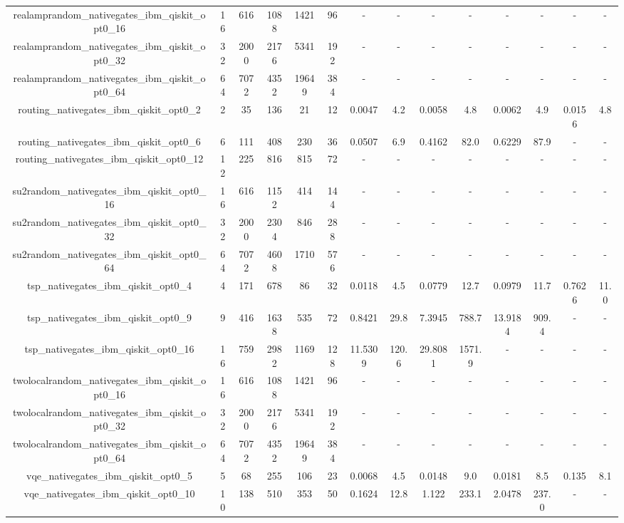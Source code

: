 \begin{table}[htb]
{\begin{tabular}{|c|c|c|c|c|c|c|c|c|c|c|c|c|c|}
realamprandom\_nativegates\_ibm\_qiskit\_opt0\_16 & 16 & 616 & 1088 & 1421 & 96 & - & - & - & - & - & - & - & - \\ 
realamprandom\_nativegates\_ibm\_qiskit\_opt0\_32 & 32 & 2000 & 2176 & 5341 & 192 & - & - & - & - & - & - & - & - \\ 
realamprandom\_nativegates\_ibm\_qiskit\_opt0\_64 & 64 & 7072 & 4352 & 19649 & 384 & - & - & - & - & - & - & - & - \\ 
routing\_nativegates\_ibm\_qiskit\_opt0\_2 & 2 & 35 & 136 & 21 & 12 & 0.0047 & 4.2 & 0.0058 & 4.8 & 0.0062 & 4.9 & 0.0156 & 4.8 \\ 
routing\_nativegates\_ibm\_qiskit\_opt0\_6 & 6 & 111 & 408 & 230 & 36 & 0.0507 & 6.9 & 0.4162 & 82.0 & 0.6229 & 87.9 & - & - \\ 
routing\_nativegates\_ibm\_qiskit\_opt0\_12 & 12 & 225 & 816 & 815 & 72 & - & - & - & - & - & - & - & - \\ 
su2random\_nativegates\_ibm\_qiskit\_opt0\_16 & 16 & 616 & 1152 & 414 & 144 & - & - & - & - & - & - & - & - \\ 
su2random\_nativegates\_ibm\_qiskit\_opt0\_32 & 32 & 2000 & 2304 & 846 & 288 & - & - & - & - & - & - & - & - \\ 
su2random\_nativegates\_ibm\_qiskit\_opt0\_64 & 64 & 7072 & 4608 & 1710 & 576 & - & - & - & - & - & - & - & - \\ 
tsp\_nativegates\_ibm\_qiskit\_opt0\_4 & 4 & 171 & 678 & 86 & 32 & 0.0118 & 4.5 & 0.0779 & 12.7 & 0.0979 & 11.7 & 0.7626 & 11.0 \\ 
tsp\_nativegates\_ibm\_qiskit\_opt0\_9 & 9 & 416 & 1638 & 535 & 72 & 0.8421 & 29.8 & 7.3945 & 788.7 & 13.9184 & 909.4 & - & - \\ 
tsp\_nativegates\_ibm\_qiskit\_opt0\_16 & 16 & 759 & 2982 & 1169 & 128 & 11.5309 & 120.6 & 29.8081 & 1571.9 & - & - & - & - \\ 
twolocalrandom\_nativegates\_ibm\_qiskit\_opt0\_16 & 16 & 616 & 1088 & 1421 & 96 & - & - & - & - & - & - & - & - \\ 
twolocalrandom\_nativegates\_ibm\_qiskit\_opt0\_32 & 32 & 2000 & 2176 & 5341 & 192 & - & - & - & - & - & - & - & - \\ 
twolocalrandom\_nativegates\_ibm\_qiskit\_opt0\_64 & 64 & 7072 & 4352 & 19649 & 384 & - & - & - & - & - & - & - & - \\ 
vqe\_nativegates\_ibm\_qiskit\_opt0\_5 & 5 & 68 & 255 & 106 & 23 & 0.0068 & 4.5 & 0.0148 & 9.0 & 0.0181 & 8.5 & 0.135 & 8.1 \\ 
vqe\_nativegates\_ibm\_qiskit\_opt0\_10 & 10 & 138 & 510 & 353 & 50 & 0.1624 & 12.8 & 1.122 & 233.1 & 2.0478 & 237.0 & - & - \\ 

\end{tabular}}
\end{table}
